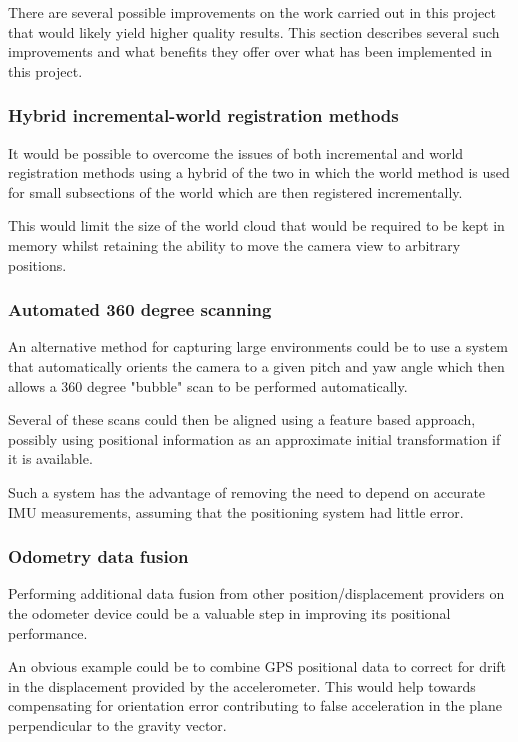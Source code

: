 \documentclass{entcs}
\begin{document}
There are several possible improvements on the work carried out in this project
that would likely yield higher quality results. This section describes several
such improvements and what benefits they offer over what has been implemented in
this project.

\subsubsection{Hybrid incremental-world registration methods}
\label{sec:further_work_hybrid_registration}

It would be possible to overcome the issues of both incremental and world
registration methods using a hybrid of the two in which the world method is used
for small subsections of the world which are then registered incrementally.

This would limit the size of the world cloud that would be required to be kept
in memory whilst retaining the ability to move the camera view to arbitrary
positions.

\subsubsection{Automated 360 degree scanning}

An alternative method for capturing large environments could be to use a system
that automatically orients the camera to a given pitch and yaw angle which then
allows a 360 degree "bubble" scan to be performed automatically.

Several of these scans could then be aligned using a feature based approach,
possibly using positional information as an approximate initial transformation
if it is available.

Such a system has the advantage of removing the need to depend on accurate IMU
measurements, assuming that the positioning system had little error.

\subsubsection{Odometry data fusion}

Performing additional data fusion from other position/displacement providers on
the odometer device could be a valuable step in improving its positional
performance.

An obvious example could be to combine GPS positional data to correct for drift
in the displacement provided by the accelerometer. This would help towards
compensating for orientation error contributing to false acceleration in the
plane perpendicular to the gravity vector.
\end{document}
